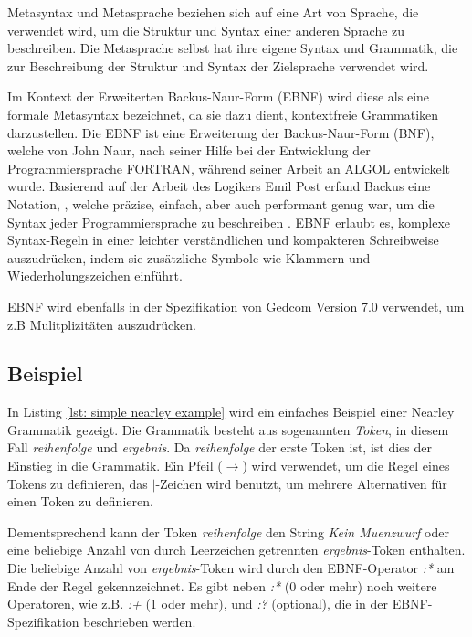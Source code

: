 Metasyntax und Metasprache beziehen sich auf eine Art von Sprache, die verwendet wird, um die Struktur und Syntax einer anderen Sprache zu beschreiben. 
Die Metasprache selbst hat ihre eigene Syntax und Grammatik, die zur Beschreibung der Struktur und Syntax der Zielsprache verwendet wird. \cite{Feynman2016}

Im Kontext der Erweiterten Backus-Naur-Form (EBNF) wird diese als eine formale Metasyntax bezeichnet, da sie dazu dient, kontextfreie Grammatiken 
darzustellen. Die EBNF ist eine Erweiterung der Backus-Naur-Form (BNF), welche von John Naur, nach seiner Hilfe bei der Entwicklung der Programmiersprache
FORTRAN, während seiner Arbeit an ALGOL entwickelt wurde. Basierend auf der Arbeit des Logikers Emil Post erfand Backus eine Notation, ,
welche präzise, einfach, aber auch performant genug war, um die Syntax jeder Programmiersprache zu beschreiben \cite{Feynman2016}. 
EBNF erlaubt es, komplexe Syntax-Regeln in einer leichter verständlichen und kompakteren Schreibweise auszudrücken, indem sie zusätzliche Symbole
wie Klammern und Wiederholungszeichen einführt.

EBNF wird ebenfalls in der Spezifikation von Gedcom Version 7.0 verwendet, um z.B Mulitplizitäten auszudrücken.

\subsection*{Beispiel}

In Listing \ref*{lst: simple nearley example} wird ein einfaches Beispiel einer Nearley Grammatik gezeigt. 
Die Grammatik besteht aus sogenannten \textit{Token}, in diesem Fall \textit{reihenfolge} und \textit{ergebnis}.
Da \textit{reihenfolge} der erste Token ist, ist dies der Einstieg in die Grammatik. 
Ein Pfeil ($\rightarrow$) wird verwendet, um die Regel eines Tokens zu definieren, das $\vert$-Zeichen wird benutzt, 
um mehrere Alternativen für einen Token zu definieren.

Dementsprechend kann der Token \textit{reihenfolge} den String \textit{Kein Muenzwurf} oder eine beliebige Anzahl
von durch Leerzeichen getrennten \textit{ergebnis}-Token enthalten.\\

Die beliebige Anzahl von \textit{ergebnis}-Token wird durch den EBNF-Operator \textit{:*} am Ende der Regel gekennzeichnet.
Es gibt neben \textit{:*} (0 oder mehr) noch weitere Operatoren, wie z.B. \textit{:+} (1 oder mehr), und \textit{:?} (optional), die in der EBNF-Spezifikation 
beschrieben werden.\\

